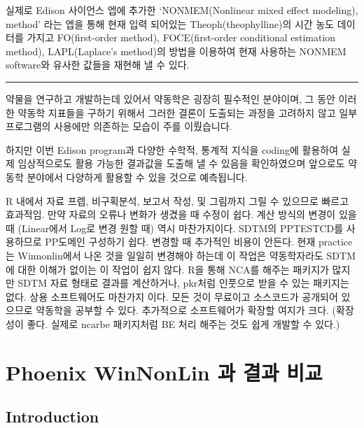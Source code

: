 \documentclass[12pt,]{krantz}
\begin{document}
실제로 Edison 사이언스 엡에 추가한 `NONMEM(Nonlinear mixed effect modeling), method' 라는 엡을 통해 현재 입력 되어있는 Theoph(theophylline)의 시간 농도 데이터를 가지고 FO(first-order method), FOCE(first-order conditional estimation method), LAPL(Laplace's method)의 방법을 이용하여 현재 사용하는 NONMEM software와 유사한 값들을 재현해 낼 수 있다.

\begin{center}\rule{0.5\linewidth}{\linethickness}\end{center}

약물을 연구하고 개발하는데 있어서 약동학은 굉장히 필수적인 분야이며, 그 동안 이러한 약동학 지표들을 구하기 위해서 그러한 결론이 도출되는 과정을 고려하지 않고 일부 프로그램의 사용에만 의존하는 모습이 주를 이뤘습니다.

하지만 이번 Edison program과 다양한 수학적, 통계적 지식을 coding에 활용하여 실제 임상적으로도 활용 가능한 결과값을 도출해 낼 수 있음을 확인하였으며 앞으로도 약동학 분야에서 다양하게 활용할 수 있을 것으로 예측됩니다.

R 내에서 자료 프렙, 비구획분석, 보고서 작성, 및 그림까지 그릴 수 있으므로 빠르고 효과적임. 만약 자료의 오류나 변화가 생겼을 때 수정이 쉽다. 계산 방식의 변경이 있을때 (Linear에서 Log로 변경 원할 때) 역시 마찬가지이다.
SDTM의 PPTESTCD를 사용하므로 PP도메인 구성하기 쉽다. 변경할 때 추가적인 비용이 안든다. 현재 practice는 Winnonlin에서 나온 것을 일일히 변경해야 하는데 이 작업은 약동학자라도 SDTM에 대한 이해가 없이는 이 작업이 쉽지 않다. R을 통해 NCA를 해주는 패키지가 많지만 SDTM 자료 형태로 결과를 계산하거나, pkr처럼 인풋으로 받을 수 있는 패키지는 없다. 상용 소프트웨어도 마찬가지 이다.
모든 것이 무료이고 소스코드가 공개되어 있으므로 약동학을 공부할 수 있다. 추가적으로 소프트웨어가 확장할 여지가 크다. (확장성이 좋다. 실제로 ncarbe 패키지처럼 BE 처리 해주는 것도 쉽게 개발할 수 있다.)

\cleardoublepage

\hypertarget{appendix-appendix}{%
\appendix {}}


\hypertarget{wnl-comparison}{%
\chapter{Phoenix WinNonLin 과 결과 비교}\label{wnl-comparison}}

\hypertarget{introduction-1}{%
\section{Introduction}\label{introduction-1}}
\end{document}
